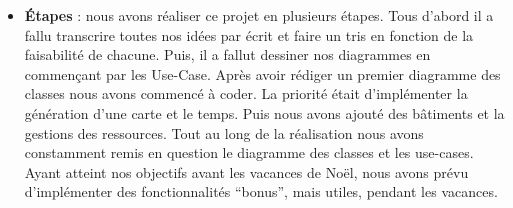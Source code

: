 \begin{itemize}
    \item[\textbullet]
    \textbf{Étapes} : nous avons réaliser ce projet en plusieurs étapes. Tous d'abord il a fallu transcrire toutes nos idées par écrit et faire un tris en fonction de la faisabilité de chacune. Puis, il a fallut dessiner nos diagrammes en commençant par les Use-Case. Après avoir rédiger un premier diagramme des classes nous avons commencé à coder. La priorité était d'implémenter la génération d'une carte et le temps. Puis nous avons ajouté des bâtiments et la gestions des ressources. Tout au long de la réalisation nous avons constamment remis en question le diagramme des classes et les use-cases. Ayant atteint nos objectifs avant les vacances de Noël, nous avons prévu d'implémenter des fonctionnalités \enquote{bonus}, mais utiles, pendant les vacances.
\end{itemize}